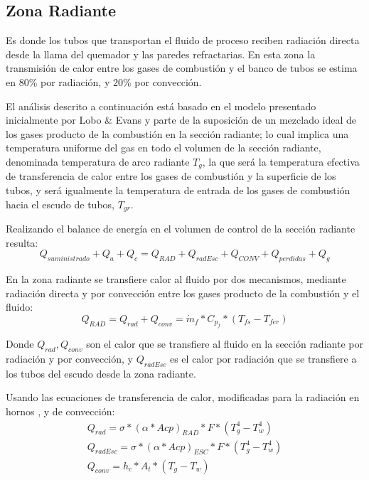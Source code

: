 \subsection{Zona Radiante}
\par Es donde los tubos que transportan el fluido de proceso reciben radiación directa desde la llama del quemador y las paredes refractarias. En esta zona la transmisión de calor entre los gases de combustión y el banco de tubos se estima en 80\% por radiación, y 20\% por convección.
\par El análisis descrito a continuación está basado en el modelo presentado inicialmente por Lobo \& Evans \cite{bib:rad} y parte de la suposición de un mezclado ideal de los gases producto de la combustión en la sección radiante; lo cual implica una temperatura uniforme del gas en todo el volumen de la sección radiante, denominada temperatura de arco radiante $T_g$, la que será la temperatura efectiva de transferencia de calor entre los gases de combustión y la superficie de los tubos, y será igualmente la temperatura de entrada de los gases de combustión hacia el escudo de tubos, $T_{gr}$.
\par Realizando el balance de energía en el volumen de control de la sección radiante resulta:
\begin{equation}
    \label{eq:rad}
    Q_{suministrado} + Q_{a} + Q_{c} = 
    Q_{RAD} + Q_{radEsc} + Q_{CONV} + Q_{perdidas} + Q_{g}
\end{equation}
\par En la zona radiante se transfiere calor al fluido por dos mecanismos, mediante radiación directa y por convección entre los gases producto de la combustión y el fluido:
\begin{equation}
    \label{eq:rad-fluid}
    Q_{RAD} = Q_{rad} + Q_{conv} = \dot m_f * C_{p_f} * (T_{fs} - T_{fer})
\end{equation}
\par Donde $Q_{rad}, Q_{conv}$ son el calor que se transfiere al fluido en la sección radiante por radiación y por convección, y $Q_{radEsc}$ es el calor por radiación que se transfiere a los tubos del escudo desde la zona radiante.
\par Usando las ecuaciones de transferencia de calor, modificadas para la radiación en hornos \cite{bib:mekler}, y de convección:
\begin{gather}
\label{eq:radiac}
    Q_{rad} = \sigma *(\alpha *Acp)_{RAD} *F *(T_{g}^{4} -T_{w}^{4})\\
    Q_{radEsc} = \sigma *(\alpha *Acp)_{ESC} *F *(T_{g}^{4} -T_{w}^{4})\\
    Q_{conv} = h_{c} * A_t * (T_g - T_w)
\end{gather}
